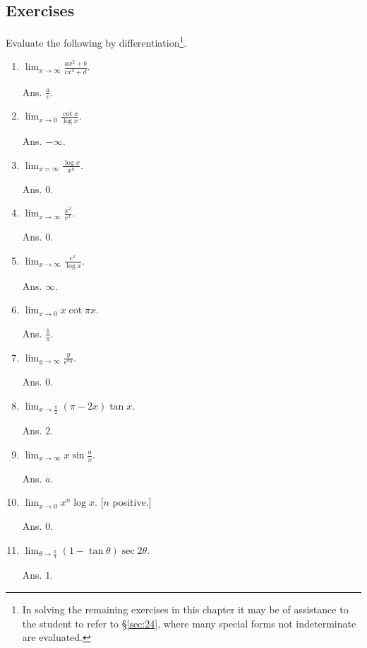 \subsection{Exercises}

Evaluate the following by differentiation\footnote{In solving the remaining 
exercises in this chapter it may be of assistance to the student to 
refer to \S \ref{sec:24}, where many special forms not 
indeterminate are evaluated.}.

\begin{enumerate}

\item
$\lim_{x \to \infty} \frac{ax^2 + b}{cx^2 + d}$. 	

Ans. $\frac{a}{c}$.

\item
$\lim_{x \to 0} \frac{\cot x}{\log x}$. 

Ans. $-\infty$.

\item
$\lim_{x = \infty} \frac{\log x}{x^n}$.

Ans. $0$.

\item
$\lim_{x \to \infty} \frac{x^2}{e^x}$. 	 

Ans. $0$.

\item
$\lim_{x \to \infty} \frac{e^x}{\log x}$. 

Ans. $\infty$.

\item
$\lim_{x \to 0} x \cot \pi x$.

Ans. $\frac{1}{\pi}$.

\item
$\lim_{y \to \infty} \frac{y}{e^{ay}}$. 

Ans. $0$.

\item
$\lim_{x \to \frac{\pi}{2}} (\pi - 2x) \tan x$. 

Ans. $2$.

\item
$\lim_{x \to \infty} x \sin \frac{a}{x}$. 	  

Ans. $a$.

\item
$\lim_{x \to 0} x^n \log x$.  [$n$ positive.]

Ans. $0$.

\item
$\lim_{\theta \to \frac{\pi}{4}} (1 - \tan \theta) \sec 2\theta$.

Ans. $1$.


\end{enumerate}
